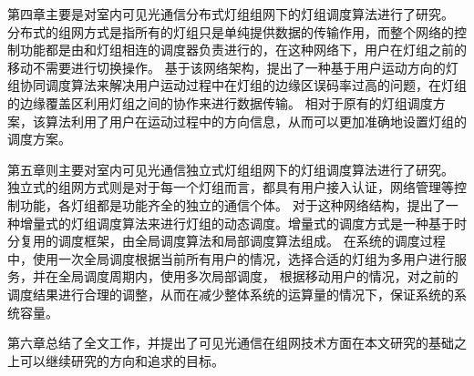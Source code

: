 第四章主要是对室内可见光通信分布式灯组组网下的灯组调度算法进行了研究。
分布式的组网方式是指所有的灯组只是单纯提供数据的传输作用，而整个网络的控制功能都是由和灯组相连的调度器负责进行的，在这种网络下，用户在灯组之前的移动不需要进行切换操作。
基于该网络架构，提出了一种基于用户运动方向的灯组协同调度算法来解决用户运动过程中在灯组的边缘区误码率过高的问题，在灯组的边缘覆盖区利用灯组之间的协作来进行数据传输。
相对于原有的灯组调度方案，该算法利用了用户在运动过程中的方向信息，从而可以更加准确地设置灯组的调度方案。

第五章则主要对室内可见光通信独立式灯组组网下的灯组调度算法进行了研究。
独立式的组网方式则是对于每一个灯组而言，都具有用户接入认证，网络管理等控制功能，各灯组都是功能齐全的独立的通信个体。
对于这种网络结构，提出了一种增量式的灯组调度算法来进行灯组的动态调度。增量式的调度方式是一种基于时分复用的调度框架，由全局调度算法和局部调度算法组成。
在系统的调度过程中，使用一次全局调度根据当前所有用户的情况，选择合适的灯组为多用户进行服务，并在全局调度周期内，使用多次局部调度，
根据移动用户的情况，对之前的调度结果进行合理的调整，从而在减少整体系统的运算量的情况下，保证系统的系统容量。

第六章总结了全文工作，并提出了可见光通信在组网技术方面在本文研究的基础之上可以继续研究的方向和追求的目标。